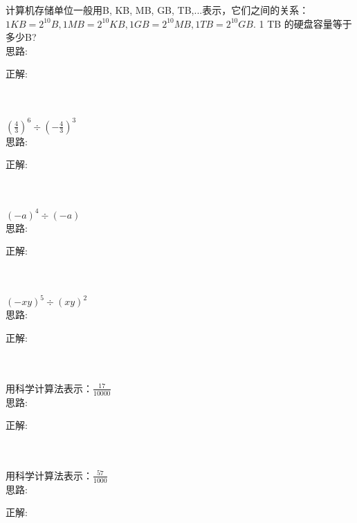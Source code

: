 \item {
    计算机存储单位一般用B, KB, MB, GB, TB,...表示，它们之间的关系：$1 KB = 2^{10} B, 1 MB = 2^{10} KB, 1 GB = 2^{10} MB, 1 TB = 2^{10} GB.$ 1 TB 的硬盘容量等于多少B?
    \ifshowSolution
        \fangsong{}
        \\
        思路:

        正解: 
    \else
        \\ \\ \\
    \fi
}

\item {
    $ (\frac{4}{3})^{6}\div (-\frac{4}{3})^{3} $
    \ifshowSolution
        \fangsong{}
        \\
        思路:

        正解: 
    \else
        \\ \\ \\
    \fi
}

\item {
    $ (-a)^{4}\div (-a) $
    \ifshowSolution
        \fangsong{}
        \\
        思路:

        正解: 
    \else
        \\ \\ \\
    \fi
}

\item {
    $ (-xy)^{5}\div (xy)^{2} $
    \ifshowSolution
        \fangsong{}
        \\
        思路:

        正解: 
    \else
        \\ \\ \\
    \fi
}

\item {
    用科学计算法表示：$ \frac{17}{10000} $
    \ifshowSolution
        \fangsong{}
        \\
        思路:

        正解: 
    \else
        \\ \\ \\
    \fi
}

\item {
    用科学计算法表示：$ \frac{57}{1000} $
    \ifshowSolution
        \fangsong{}
        \\
        思路:

        正解: 
    \else
        \\ \\ \\
    \fi
}

